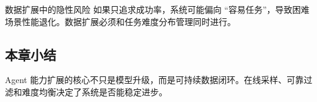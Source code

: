 \begin{warningbox}{数据扩展中的隐性风险}
如果只追求成功率，系统可能偏向 ``容易任务''，导致困难场景性能退化。数据扩展必须和任务难度分布管理同时进行。
\end{warningbox}

\subsection{本章小结}
Agent 能力扩展的核心不只是模型升级，而是可持续数据闭环。在线采样、可靠过滤和难度均衡决定了系统是否能稳定进步。

